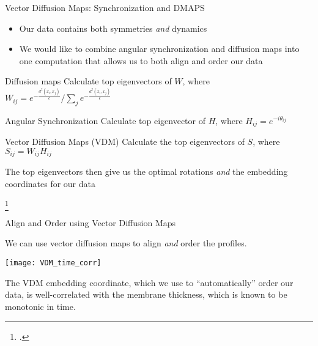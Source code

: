 \begin{frame}{Vector Diffusion Maps: Synchronization and DMAPS}
	\begin{itemize}
		\item Our data contains both symmetries {\em and} dynamics
		\item We would like to combine angular synchronization and diffusion maps into one computation that allows us to both align and order our data
	\end{itemize}
	
	\begin{block}{Diffusion maps}
		Calculate top eigenvectors of $W$, where $W_{ij} = e^{-\frac{d^2(x_i, x_j)}{\epsilon}} / \sum_j e^{-\frac{d^2(x_i, x_j)}{\epsilon}} $
	\end{block}

	\begin{block}{Angular Synchronization}
		Calculate top eigenvector of $H$, where $H_{ij} = e^{-i \theta_{ij}}$
	\end{block}
	
	\begin{block}{Vector Diffusion Maps (VDM) \footnotemark} 
		Calculate the top eigenvectors of $S$, where $S_{ij} = W_{ij}H_{ij}$
		
		The top eigenvectors then give us the optimal rotations {\em and} the embedding coordinates for our data
	\end{block}
	\footcitetext{singer2012vector}
\end{frame}

\begin{frame}{Align and Order using Vector Diffusion Maps}

	\centering
	We can use vector diffusion maps to align {\em and} order the profiles.

	
	\begin{minipage}{0.4\textwidth}
	\texttt{[image: VDM\_time\_corr]}	
	\end{minipage}
	\begin{minipage}{0.5\textwidth}
	The VDM embedding coordinate, which we use to ``automatically'' order our data, is well-correlated with the membrane thickness, which is known to be monotonic in time.
	\end{minipage}

\end{frame}